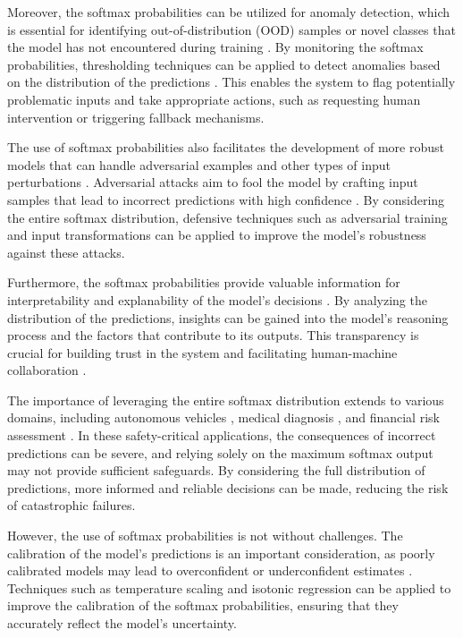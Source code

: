 Moreover, the softmax probabilities can be utilized for anomaly detection, which is essential for identifying out-of-distribution (OOD) samples or novel classes that the model has not encountered during training \cite{hendrycks17baseline}. By monitoring the softmax probabilities, thresholding techniques can be applied to detect anomalies based on the distribution of the predictions \cite{liang2018enhancing}. This enables the system to flag potentially problematic inputs and take appropriate actions, such as requesting human intervention or triggering fallback mechanisms.

The use of softmax probabilities also facilitates the development of more robust models that can handle adversarial examples and other types of input perturbations \cite{goodfellow2014explaining}. Adversarial attacks aim to fool the model by crafting input samples that lead to incorrect predictions with high confidence \cite{szegedy2013intriguing}. By considering the entire softmax distribution, defensive techniques such as adversarial training \cite{madry2017towards} and input transformations \cite{guo2018countering} can be applied to improve the model's robustness against these attacks.

Furthermore, the softmax probabilities provide valuable information for interpretability and explanability of the model's decisions \cite{ribeiro2016should}. By analyzing the distribution of the predictions, insights can be gained into the model's reasoning process and the factors that contribute to its outputs. This transparency is crucial for building trust in the system and facilitating human-machine collaboration \cite{doshi2017towards}.

The importance of leveraging the entire softmax distribution extends to various domains, including autonomous vehicles \cite{michelmore2018evaluating}, medical diagnosis \cite{leibig2017leveraging}, and financial risk assessment \cite{feng2018deep}. In these safety-critical applications, the consequences of incorrect predictions can be severe, and relying solely on the maximum softmax output may not provide sufficient safeguards. By considering the full distribution of predictions, more informed and reliable decisions can be made, reducing the risk of catastrophic failures.

However, the use of softmax probabilities is not without challenges. The calibration of the model's predictions is an important consideration, as poorly calibrated models may lead to overconfident or underconfident estimates \cite{guo2017calibration}. Techniques such as temperature scaling \cite{guo2017calibration} and isotonic regression \cite{zadrozny2002transforming} can be applied to improve the calibration of the softmax probabilities, ensuring that they accurately reflect the model's uncertainty.

